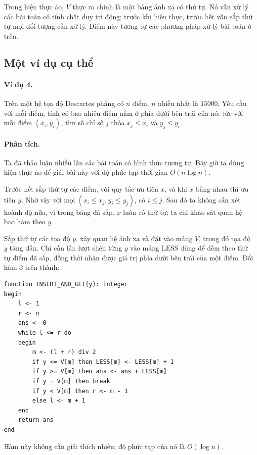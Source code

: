 \documentclass[11pt]{article}
\begin{document}
Trong hiện thực ảo, \(V\) thực ra chính là một bảng ánh xạ có thứ tự. Nó vẫn
xử lý các bài toán có tính chất duy trì động; trước khi hiện thực, trước hết
vẫn sắp thứ tự mọi đối tượng cần xử lý. Điểm này tương tự các phương pháp xử
lý bài toán ở trên.

\subsection{Một ví dụ cụ thể}

\paragraph{Ví dụ 4.}
Trên một hệ tọa độ Descartes phẳng có \(n\) điểm, \(n\) nhiều nhất là
\(15000\). Yêu cầu với mỗi điểm, tính có bao nhiêu điểm nằm ở phía dưới bên
trái của nó; tức với mỗi điểm \((x_i,y_i)\), tìm số chỉ số \(j\) thỏa
\(x_j\le x_i\) và \(y_j\le y_i\).

\paragraph{Phân tích.}
Ta đã thảo luận nhiều lần các bài toán có hình thức tương tự. Bây giờ ta dùng
hiện thực ảo để giải bài này với độ phức tạp thời gian \(O(n\log n)\).

Trước hết sắp thứ tự các điểm, với quy tắc ưu tiên \(x\), và khi \(x\) bằng
nhau thì ưu tiên \(y\). Nhờ vậy với mọi \((x_i\le x_j,y_i\le y_j)\), có
\(i\le j\). Sau đó ta không cần xét hoành độ nữa, vì trong bảng đã sắp, \(x\)
luôn có thứ tự; ta chỉ khảo sát quan hệ bao hàm theo \(y\).

Sắp thứ tự các tọa độ \(y\), xây quan hệ ánh xạ và đặt vào mảng \(V\), trong
đó tọa độ \(y\) tăng dần. Chỉ cần lần lượt chèn từng \(y\) vào mảng
\(\mathrm{LESS}\) dùng để đếm theo thứ tự điểm đã sắp, đồng thời nhận được
giá trị phía dưới bên trái của một điểm. Đổi hàm ở trên thành:

\begin{verbatim}
function INSERT_AND_GET(y): integer
begin
    l <- 1
    r <- n
    ans <- 0
    while l <= r do
    begin
        m <- (l + r) div 2
        if y <= V[m] then LESS[m] <- LESS[m] + 1
        if y >= V[m] then ans <- ans + LESS[m]
        if y = V[m] then break
        if y < V[m] then r <- m - 1
        else l <- m + 1
    end
    return ans
end
\end{verbatim}

Hàm này không cần giải thích nhiều; độ phức tạp của nó là \(O(\log n)\).
\end{document}
